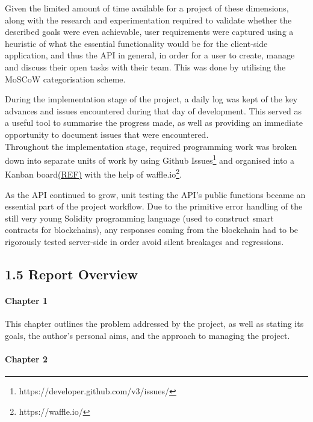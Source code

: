 \documentclass[12pt]{report}
\let\oldparagraph\paragraph
\renewcommand{\paragraph}[1]{\oldparagraph{#1}\mbox{}}
\begin{document}
Given the limited amount of time available for a project of these
dimensions, along with the research and experimentation required to
validate whether the described goals were even achievable, user
requirements were captured using a heuristic of what the essential
functionality would be for the client-side application, and thus the API
in general, in order for a user to create, manage and discuss their open
tasks with their team. This was done by utilising the MoSCoW
categorisation scheme\cite{1moscow}.

During the implementation stage of the project, a daily log was kept of the key advances and issues encountered during
that day of development. This served as a useful tool to summarise the
progress made, as well as providing an immediate opportunity to document
issues that were encountered.\\
Throughout the implementation stage, required programming work was
broken down into separate units of work by using Github
Issues\footnote{https://developer.github.com/v3/issues/} and organised into a Kanban board\href{}{(REF)}
with the help of waffle.io\footnote{https://waffle.io/}.

As the API continued to grow, unit testing the API's public functions became an
essential part of the project workflow. Due to the primitive error
handling of the still very young Solidity programming language (used to
construct smart contracts for blockchains), any responses coming from
the blockchain had to be rigorously tested server-side in order avoid
silent breakages and regressions.

\clearpage

\subsection{1.5 Report Overview}\label{report-overview}

\paragraph{Chapter 1}\label{chapter-1-1}

This chapter outlines the problem addressed by the project, as well as
stating its goals, the author's personal aims, and the approach to
managing the project.

\paragraph{Chapter 2}\label{chapter-2}
\end{document}
